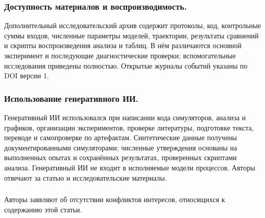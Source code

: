 \begin{credits}
\subsubsection{Доступность материалов и воспроизводимость.}
Дополнительный исследовательский архив содержит протоколы, код, контрольные суммы входов, численные параметры моделей, траектории, результаты сравнений и скрипты воспроизведения анализа и таблиц. В нём различаются основной эксперимент и последующие диагностические проверки; вспомогательные исследования приведены полностью. Открытые журналы событий указаны по DOI версии 1.
\subsubsection{Использование генеративного ИИ.}
Генеративный ИИ использовался при написании кода симуляторов, анализа и графиков, организации экспериментов, проверке литературы, подготовке текста, переводе и самопроверке по артефактам. Синтетические данные получены документированными симуляторами; численные утверждения основаны на выполненных опытах и сохранённых результатах, проверенных скриптами анализа. Генеративный ИИ не входит в исполняемые модели процессов. Авторы отвечают за статью и исследовательские материалы.
\subsubsection{\discintname}
Авторы заявляют об отсутствии конфликтов интересов, относящихся к содержанию этой статьи.
\end{credits}
